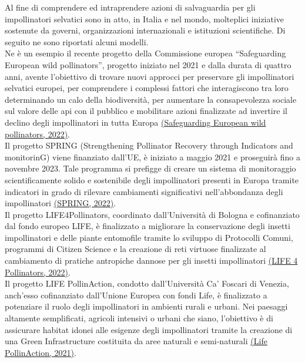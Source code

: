 \documentclass[main.tex]{subfiles}
\begin{document}
Al fine di comprendere ed intraprendere azioni di salvaguardia per gli impollinatori selvatici sono in atto, in Italia e nel mondo, molteplici iniziative sostenute da governi, organizzazioni internazionali e istituzioni scientifiche. Di seguito ne sono riportati alcuni modelli.\\
Ne è un esempio il recente progetto della Commissione europea “Safeguarding European wild pollinators”, progetto iniziato nel 2021 e dalla durata di quattro anni, avente l’obiettivo di trovare nuovi approcci per preservare gli impollinatori selvatici europei, per comprendere i complessi fattori che interagiscono tra loro determinando un calo della biodiversità, per aumentare la consapevolezza sociale sul valore delle api con il pubblico e mobilitare azioni finalizzate ad invertire il declino degli impollinatori in tutta Europa \href{https://cordis.europa.eu/project/id/101003476/it}{(Safeguarding European wild pollinators, 2022)}.\\
Il progetto SPRING (Strengthening Pollinator Recovery through Indicators and monitorinG) viene finanziato dall’UE, è iniziato a maggio 2021 e proseguirà fino a novembre 2023. Tale programma si prefigge di creare un sistema di monitoraggio scientificamente solido e sostenibile degli impollinatori presenti in Europa tramite indicatori in grado di rilevare cambiamenti significativi nell’abbondanza degli impollinatori \href{https://www.ufz.de/spring-pollination/}{(SPRING, 2022)}.\\
Il progetto LIFE4Pollinators, coordinato dall'Università di Bologna e cofinanziato dal fondo europeo LIFE, è finalizzato a migliorare la conservazione degli insetti impollinatori e delle piante entomofile tramite lo sviluppo di Protocolli Comuni, programmi di Citizen Science e la creazione di reti virtuose finalizzate al cambiamento di pratiche antropiche dannose per gli insetti impollinatori \href{https://www.life4pollinators.eu/}{(LIFE 4 Pollinators, 2022)}.\\
Il progetto LIFE PollinAction, condotto dall'Università Ca' Foscari di Venezia, anch’esso cofinanziato dall’Unione Europea con fondi Life, è finalizzato a potenziare il ruolo degli impollinatori in ambienti rurali e urbani. Nei paesaggi altamente semplificati, agricoli intensivi o urbani che siano, l’obiettivo è di assicurare habitat idonei alle esigenze degli impollinatori tramite la creazione di una Green Infrastructure costituita da aree naturali e semi-naturali \href{https://mizar.unive.it/lifepollinaction.eu/}{(Life PollinAction, 2021)}.\\
\end{document}
